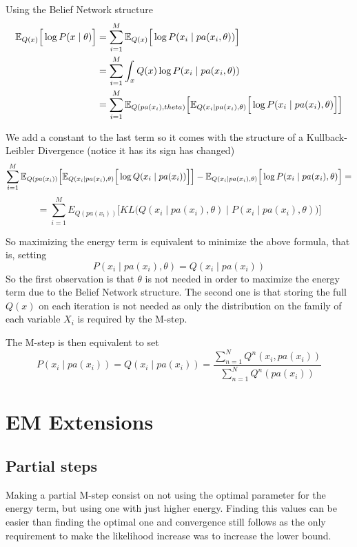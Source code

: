 Using the Belief Network structure
\[
  \begin{aligned}
    \mathbb{E}_{Q(x)}\Big[\log{P(x \mid \theta)}\Big] &= \sum_{i = 1}^{M}\mathbb{E}_{Q(x)}\Big[\log{P(x_{i} \mid pa(x_{i}, \theta))}\Big]\\
    &= \sum_{i=1}^{M} \int_{x}Q(x) \log{P(x_{i} \mid pa(x_{i}, \theta))}\\
    &= \sum_{i = 1}^{M}\mathbb{E}_{Q(pa(x_{i}), theta)}\Big[ \mathbb{E}_{Q(x_{i}\mid pa(x_{i}), \theta)}\Big[ \log{P(x_{i} \mid pa(x_{i}), \theta)}\Big]\Big]
\end{aligned}
\]

We add a constant to the last term so it comes with the structure of a Kullback-Leibler Divergence (notice it has its sign has changed)
\[
  \sum_{i = 1}^{M}\mathbb{E}_{Q(pa(x_{i}))}\Big[\mathbb{E}_{Q(x_{i}\mid pa(x_{i}), \theta)}\Big[\log{Q(x_{i} \mid pa(x_{i}))}\Big]\Big] - \mathbb{E}_{Q(x_{i}\mid pa(x_{i}), \theta)}\Big[\log{P(x_{i} \mid pa(x_{i}), \theta)}\Big]=
\]
\[
  = \sum_{i = 1}^{M} E_{Q(pa(x_{i}))} \Big[KL \Big( Q(x_{i}\mid pa(x_{i}), \theta) \mid P(x_{i} \mid pa(x_{i}), \theta) \Big) \Big]
\]

So maximizing the energy term is equivalent to minimize the above formula, that is, setting
\[
  P(x_{i} \mid pa(x_{i}), \theta) = Q(x_{i} \mid pa(x_{i}))
\]
So the first observation is that \(\theta\) is not needed in order to maximize the energy term due to the Belief Network structure. The second one is that storing the full \(Q(x)\) on each iteration is not needed as only the distribution on the family of each variable \(X_{i}\) is required by the M-step.

The M-step is then equivalent to set
\[
  P(x_{i}\mid pa(x_{i})) = Q(x_{i} \mid pa(x_{i})) = \frac{\sum_{n = 1}^{N} Q^{n}(x_{i}, pa(x_{i}))}{\sum_{n=1}^{N} Q^{n}(pa(x_{i}))}
\]

\section{EM Extensions}

\subsection{Partial steps}

Making a partial M-step consist on not using the optimal parameter for the energy term, but using one with just higher energy. Finding this values can be easier than finding the optimal one and convergence still follows as the only requirement to make the likelihood increase was to increase the lower bound.

